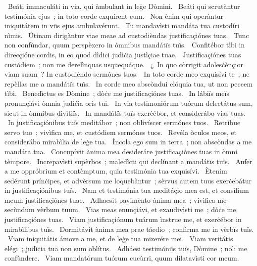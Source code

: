 \psalmChapterWithInscription{}
{ }
{%
~Beáti immaculáti in via, qui àmbulant in leġe Dòmini. 
~Beáti qui scrutàntur testimónia ejus~; in toto corde exquírent eum. 
~Non ènim qui operàntur iniquitátem in viïs ejus ambulavérunt. 
~Tu mandavìsti mandáta tua custodíri nìmis. 
~Útinam dirigàntur viae meae ad custodièndas justificaçiónes tuas. 
~Tunc non confùndar, quum perspèxero in òmnibus mandátïs tuïs. 
~Confitébor tìbi in direcçióne cordis, in eo quod dìdici judìċia justìçiae tuae. 
~Justificaçiónes tuas custódiem~; non me derelìnquas usquequáque. 
~¿~In quo còrrigit adolesċènçior viam suam~? In custodièndo sermónes tuos. 
~In toto corde meo exquisívi te~; ne repèllas me a mandátïs tuïs. 
~In corde meo abscòndui elóquia tua, ut non peccem tìbi. 
~Benedìctus es Dòmine~; dòċe me justificaçiónes tuas. 
~In lábiïs meïs pronunçiávi òmnia judìċia oris tui. 
~In via testimoniórum tuórum delectátus sum, sicut in òmnibus divìtiïs. 
~In mandátïs tuïs exerċébor, et considerábo vias tuas. 
~In justificaçiónibus tuïs meditábor~; non oblivíscer sermónes tuos. 
~Retrìbue servo tuo~; vivìfica me, et custódiem sermónes tuos. 
~Revéla òculos meos, et considerábo mirabìlia de leġe tua. 
~Ìncola ego sum in terra~; non abscòndas a me mandáta tua. 
~Concupívit ànima mea desideráre justificaçiónes tuas in òmni tèmpore. 
~Increpavìsti supèrbos~; maledìcti qui declínant a mandátïs tuïs. 
~Aufer a me oppróbrium et contèmptum, quia testimónia tua exquisívi. 
~Ètenim sedérunt prínċipes, et advèrsum me loquebàntur~; sèrvus autem tuus exerċebátur in justificaçiónibus tuïs. 
~Nam et testimónia tua meditáçio mea est, et consìlium meum justificaçiónes tuae. 
~Adhaesit pavimènto ànima mea~; vivìfica me secùndum vèrbum tuum. 
~Vias meas enunçiávi, et exaudivìsti me~; dòċe me justificaçiónes tuas. 
~Viam justificaçiónum tuárum ìnstrue me, et exerċébor in mirabìlibus tuïs. 
~Dormitávit ànima mea prae táedio~; confìrma me in vèrbïs tuïs. 
~Viam iniquitátis ámove a me, et de leġe tua mizerére mei. 
~Viam veritátis elégi~; judìċia tua non sum oblítus. 
~Adháesi testimóniïs tuïs, Dòmine~; noli me confùndere. 
~Viam mandatórum tuórum cucùrri, quum dilatavìsti cor meum. 
}
